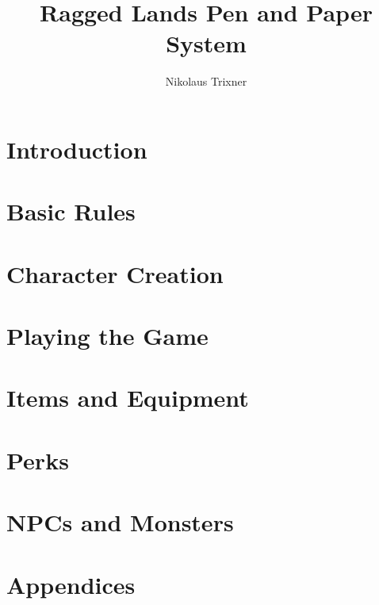 \documentclass{report}
\begin{document}
	\title{Ragged Lands Pen and Paper System}
	\author{Nikolaus Trixner}
		
	\maketitle
	
	\tableofcontents

\part{Introduction}
	
	
\newpage

\part{Basic Rules}
	
\newpage

\part{Character Creation}
	
	
	
	
	
\newpage

\part{Playing the Game}
	
	
	
	
\newpage

\part{Items and Equipment}
	
	
	
\newpage

\part{Perks}
	
	
	
	
	
	
\newpage

\part{NPCs and Monsters}
	
\newpage

\part{Appendices}
\begin{appendices}
	
	
	
\newpage

\end{appendices}
\end{document}
